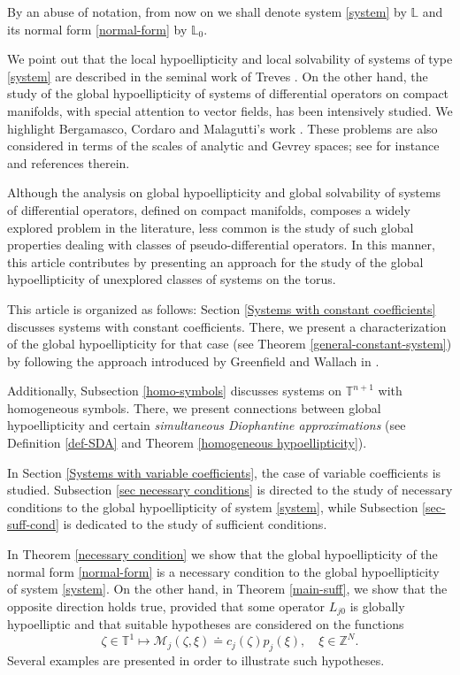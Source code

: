 \documentclass[12pt]{elsarticle}
\numberwithin{equation}{section}
\begin{document}
By an abuse of notation,  from now on we shall denote  system \eqref{system} by $\mathbb{L}$ and its normal form \eqref{normal-form} by 
$\mathbb{L}_0$. 


 
We point out that the local hypoellipticity and local solvability of systems of type \eqref{system} are described  in the seminal work of Treves \cite{treves76}. On the other hand, 
the study of the global hypoellipticity of systems of differential operators on compact manifolds, with special attention to vector fields,  has been intensively studied. We highlight  Bergamasco, Cordaro and Malagutti's work \cite{BCM93}. These problems are also considered in terms of the scales of analytic and Gevrey spaces; see for instance  \cite{BERG99,AKM} and references therein.


Although the analysis on global hypoellipticity and global solvability  of systems of differential operators, defined on compact manifolds, composes a widely explored problem in the literature, less common is the study of such global properties dealing with classes of pseudo-differential operators. In this manner, this article contributes by presenting an approach for the study of the global hypoellipticity of unexplored classes of systems on the torus.


This article is organized as follows: Section \ref{Systems with constant coefficients} discusses systems with cons\-tant coefficients. There, we present a characterization of the global hypoellipticity  for that case (see Theorem \ref{general-constant-system}) by following the approach introduced by Greenfield and Wallach in \cite{GW1}.


Additionally, Subsection \ref{homo-symbols} discusses systems on $\mathbb{T}^{n+1}$ with homogeneous symbols. There, we  present connections between global hypoellipticity and certain \textit{simultaneous Diophantine approximations} (see Definition \ref{def-SDA} and Theorem \ref{homogeneous hypoellipticity}). 

In Section \ref{Systems with variable coefficients}, the case of variable coefficients is studied. Subsection \ref{sec necessary conditions} is directed to the study of necessary conditions to the global hypoellipticity of  system \eqref{system}, while  Subsection \ref{sec-suff-cond} is dedicated to the study of sufficient conditions. 

In Theorem \ref{necessary condition} we show that the global hypoellipticity of the normal form \eqref{normal-form} is a necessary condition to the global hypoellipticity of system \eqref{system}. On the other hand, in Theorem \eqref{main-suff}, we show that the opposite direction holds true, provided that some operator  $L_{j0}$ is globally hypoelliptic and that suitable hypotheses are considered on the functions
$$
\zeta \in \mathbb{T}^1  \mapsto \mathcal{M}_j(\zeta, \xi) \doteq c_j(\zeta)p_j(\xi), \quad\xi \in \mathbb{Z}^N.
$$
Several examples are presented in order to illustrate such hypotheses.
\end{document}
